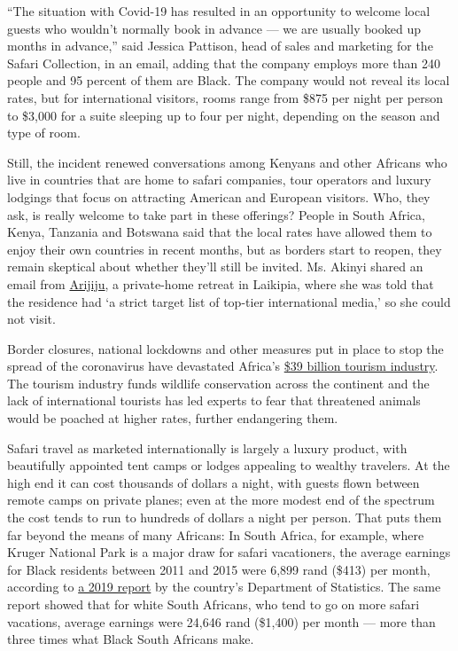 ``The situation with Covid-19 has resulted in an opportunity to welcome
local guests who wouldn't normally book in advance --- we are usually
booked up months in advance,'' said Jessica Pattison, head of sales and
marketing for the Safari Collection, in an email, adding that the
company employs more than 240 people and 95 percent of them are Black.
The company would not reveal its local rates, but for international
visitors, rooms range from \$875 per night per person to \$3,000 for a
suite sleeping up to four per night, depending on the season and type of
room.

Still, the incident renewed conversations among Kenyans and other
Africans who live in countries that are home to safari companies, tour
operators and luxury lodgings that focus on attracting American and
European visitors. Who, they ask, is really welcome to take part in
these offerings? People in South Africa, Kenya, Tanzania and Botswana
said that the local rates have allowed them to enjoy their own countries
in recent months, but as borders start to reopen, they remain skeptical
about whether they'll still be invited. Ms. Akinyi shared an email from
\href{https://www.arijiju.com/}{Arijiju}, a private-home retreat in
Laikipia, where she was told that the residence had `a strict target
list of top-tier international media,' so she could not visit.

Border closures, national lockdowns and other measures put in place to
stop the spread of the coronavirus have devastated Africa's
\href{https://www.brookings.edu/wp-content/uploads/2018/12/Africas-tourism-potential_LandrySigne1.pdf}{\$39
billion tourism industry}. The tourism industry funds wildlife
conservation across the continent and the lack of international tourists
has led experts to fear that threatened animals would be poached at
higher rates, further endangering them.

Safari travel as marketed internationally is largely a luxury product,
with beautifully appointed tent camps or lodges appealing to wealthy
travelers. At the high end it can cost thousands of dollars a night,
with guests flown between remote camps on private planes; even at the
more modest end of the spectrum the cost tends to run to hundreds of
dollars a night per person. That puts them far beyond the means of many
Africans: In South Africa, for example, where Kruger National Park is a
major draw for safari vacationers, the average earnings for Black
residents between 2011 and 2015 were 6,899 rand (\$413) per month,
according to
\href{http://www.statssa.gov.za/publications/Report-03-10-19/Report-03-10-192017.pdf}{a
2019 report} by the country's Department of Statistics. The same report
showed that for white South Africans, who tend to go on more safari
vacations, average earnings were 24,646 rand (\$1,400) per month ---
more than three times what Black South Africans make.

